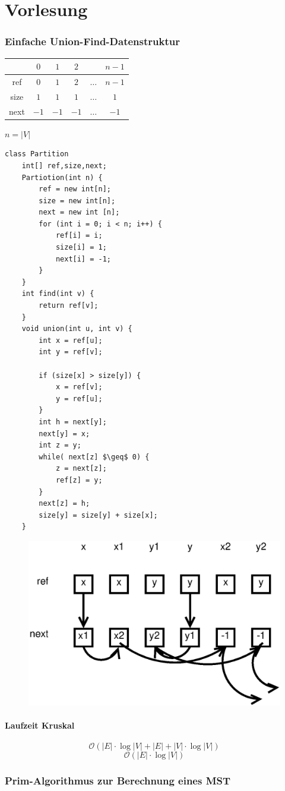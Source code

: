 \chapter{Vorlesung}
\subsection{Einfache Union-Find-Datenstruktur}
\begin{tabular}{c|c|c|c|c|c|}
	    &$0$&$1$&$2$&        &$n-1$\\ \hline
	ref &$0$&$1$&$2$&$\ldots$&$n-1$\\ \hline
	size&$1$&$1$&$1$&$\ldots$&  $1$\\ \hline
	next&$-1$&$-1$&$-1$&$\ldots$&$-1$\\ \hline	
\end{tabular}
$n=|V|$\\
\begin{lstlisting}
class Partition
	int[] ref,size,next;
	Partiotion(int n) {
		ref = new int[n];
		size = new int[n];
		next = new int [n];
		for (int i = 0; i < n; i++) {
			ref[i] = i;
			size[i] = 1;
			next[i] = -1;
		}
	}
	int find(int v) {
		return ref[v];
	}
	void union(int u, int v) {
		int x = ref[u];
		int y = ref[v];
		
		if (size[x] > size[y]) {
			x = ref[v];
			y = ref[u];
		}
		int h = next[y];
		next[y] = x;
		int z = y;
		while( next[z] $\geq$ 0) {
			z = next[z];
			ref[z] = y;
		}
		next[z] = h;
		size[y] = size[y] + size[x];
	}
\end{lstlisting}

\begin{figure}[h]
\centering
\includegraphics[width=0.3\linewidth]{20/Grafik/img1}
\end{figure}

\subsubsection{Laufzeit Kruskal}
\[ \mathcal{O}(|E|\cdot\log|V|+|E|+|V|\cdot\log|V|) \]
\[ \mathcal{O}(|E|\cdot\log|V|) \]
\subsection{Prim-Algorithmus zur Berechnung eines MST}

